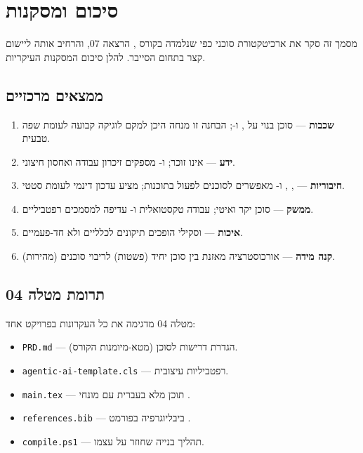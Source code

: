 \section{סיכום ומסקנות}

מסמך זה סקר את ארכיטקטורת סוכני  כפי שנלמדה בקורס ,
הרצאה 07, והרחיב אותה ליישום קצר בתחום הסייבר. להלן סיכום המסקנות העיקריות.

\subsection{ממצאים מרכזיים}

\begin{enumerate}[rightmargin=2em]
  \item \textbf{שכבות} --- סוכן בנוי על ,  ו-;
    הבחנה זו מנחה היכן למקם לוגיקה קבועה לעומת שפה טבעית.
  \item \textbf{ידע} ---  אינו זוכר;  ו-
    מספקים זיכרון עבודה ואחסון חיצוני.
  \item \textbf{חיבוריות} --- , ,  ו- מאפשרים
    לסוכנים לפעול בתוכנות;  מציע עדכון דינמי לעומת  סטטי.
  \item \textbf{ממשק} --- סוכן  יקר ואיטי; עבודה טקסטואלית ו-
    עדיפה למסמכים רפטביליים.
  \item \textbf{איכות} ---  וסקילי  הופכים תיקונים לכלליים
    ולא חד-פעמיים.
  \item \textbf{קנה מידה} --- אורכוסטרציה מאזנת בין סוכן יחיד (פשטות) לריבוי
    סוכנים (מהירות).
\end{enumerate}

\subsection{תרומת מטלה 04}

מטלה 04 מדגימה את כל העקרונות בפרויקט אחד:
\begin{itemize}[rightmargin=2em]
  \item \texttt{PRD.md} --- הגדרת דרישות לסוכן (מטא-מיומנות הקורס).
  \item \texttt{agentic-ai-template.cls} --- רפטביליות עיצובית.
  \item \texttt{main.tex} --- תוכן מלא בעברית עם מונחי .
  \item \texttt{references.bib} --- ביבליוגרפיה בפורמט .
  \item \texttt{compile.ps1} --- תהליך בנייה שחוזר על עצמו.
\end{itemize}

